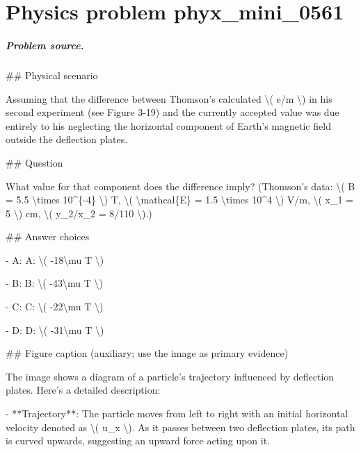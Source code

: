 
\chapter{Physics problem phyx\_mini\_0561}
\label{ch:PhyXMiniProblems_problem_phyx_mini_0561}

\paragraph{Problem source.}
\#\# Physical scenario

Assuming that the difference between Thomson's calculated \textbackslash{}( e/m \textbackslash{}) in his second experiment (see Figure 3-19) and the currently accepted value was due entirely to his neglecting the horizontal component of Earth's magnetic field outside the deflection plates.

\#\# Question

What value for that component does the difference imply? (Thomson's data: \textbackslash{}( B = 5.5 \textbackslash{}times 10\textasciicircum{}\{-4\} \textbackslash{}) T, \textbackslash{}( \textbackslash{}mathcal\{E\} = 1.5 \textbackslash{}times 10\textasciicircum{}4 \textbackslash{}) V/m, \textbackslash{}( x\_1 = 5 \textbackslash{}) cm, \textbackslash{}( y\_2/x\_2 = 8/110 \textbackslash{}).)

\#\# Answer choices

- A: A: \textbackslash{}( -18\textbackslash{}mu T \textbackslash{})

- B: B: \textbackslash{}( -43\textbackslash{}mu T \textbackslash{})

- C: C: \textbackslash{}( -22\textbackslash{}mu T \textbackslash{})

- D: D: \textbackslash{}( -31\textbackslash{}mu T \textbackslash{})

\#\# Figure caption (auxiliary; use the image as primary evidence)

The image shows a diagram of a particle's trajectory influenced by deflection plates. Here's a detailed description:

- **Trajectory**: The particle moves from left to right with an initial horizontal velocity denoted as \textbackslash{}( u\_x \textbackslash{}). As it passes between two deflection plates, its path is curved upwards, suggesting an upward force acting upon it.

